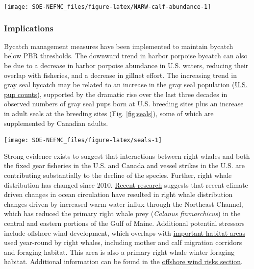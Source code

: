 \documentclass[
  10pt,
]{article}
\let\origfigure\figure
\let\endorigfigure\endfigure
\renewenvironment{figure}[1][2] {
    \expandafter\origfigure\expandafter[H]
} {
    \endorigfigure
}
\begin{document}
\begin{figure}

{\centering \texttt{[image: SOE-NEFMC\_files/figure-latex/NARW-calf-abundance-1]} 

}

\caption{Number of North Atlantic right whale calf births, 1990 - 2021.}\label{fig:NARW-calf-abundance}
\end{figure}

\hypertarget{implications-5}{%
\subsubsection{Implications}\label{implications-5}}

Bycatch management measures have been implemented to maintain bycatch below PBR thresholds. The downward trend in harbor porpoise bycatch can also be due to a decrease in harbor porpoise abundance in U.S. waters, reducing their overlap with fisheries, and a decrease in gillnet effort. The increasing trend in gray seal bycatch may be related to an increase in the gray seal population (\href{https://noaa-edab.github.io/catalog/seal_pups.html}{U.S. pup counts}), supported by the dramatic rise over the last three decades in observed numbers of gray seal pups born at U.S. breeding sites plus an increase in adult seals at the breeding sites (Fig. \ref{fig:seals}), some of which are supplemented by Canadian adults.

\begin{figure}

{\centering \texttt{[image: SOE-NEFMC\_files/figure-latex/seals-1]} 

}

\caption{Estimated number of gray seal pups born at four United States pupping colonies at various times from 1988 to 2021. Recreated from Wood et al. 2022 (Figure 5).}\label{fig:seals}
\end{figure}

Strong evidence exists to suggest that interactions between right whales and both the fixed gear fisheries in the U.S. and Canada and vessel strikes in the U.S. are contributing substantially to the decline of the species. Further, right whale distribution has changed since 2010. \href{https://noaa-edab.github.io/catalog/narw.html}{Recent research} suggests that recent climate driven changes in ocean circulation have resulted in right whale distribution changes driven by increased warm water influx through the Northeast Channel, which has reduced the primary right whale prey (\emph{Calanus finmarchicus}) in the central and eastern portions of the Gulf of Maine. Additional potential stressors include offshore wind development, which overlaps with \href{https://noaa-edab.github.io/catalog/cetacean_acoustic.html}{important habitat areas} used year-round by right whales, including mother and calf migration corridors and foraging habitat. This area is also a primary right whale winter foraging habitat. Additional information can be found in the \protect\hyperlink{wind-risks}{offshore wind risks section}.
\end{document}
